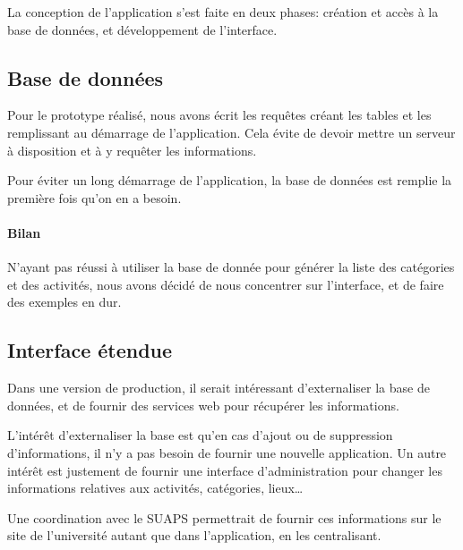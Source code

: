 \documentclass{article}
\begin{document}
    La conception de l'application s'est faite en deux phases: création et accès
    à la base de données, et développement de l'interface.

    \subsection{Base de données}

        Pour le prototype réalisé, nous avons écrit les requêtes créant les
        tables et les remplissant au démarrage de l'application. Cela évite de
        devoir mettre un serveur à disposition et à y requêter les informations.

        Pour éviter un long démarrage de l'application, la base de données est
        remplie la première fois qu'on en a besoin.

        \paragraph{Bilan} N'ayant pas réussi à utiliser la base de donnée pour
        générer la liste des catégories et des activités, nous avons décidé de
        nous concentrer sur l'interface, et de faire des exemples en dur.


    \subsection{Interface étendue}

        Dans une version de production, il serait intéressant d'externaliser la
        base de données, et de fournir des services web pour récupérer les
        informations.

        L'intérêt d'externaliser la base est qu'en cas d'ajout ou de suppression
        d'informations, il n'y a pas besoin de fournir une nouvelle application.
        Un autre intérêt est justement de fournir une interface d'administration
        pour changer les informations relatives aux activités, catégories,
        lieux\dots

        Une coordination avec le SUAPS permettrait de fournir ces informations
        sur le site de l'université autant que dans l'application, en les centralisant.
\end{document}
